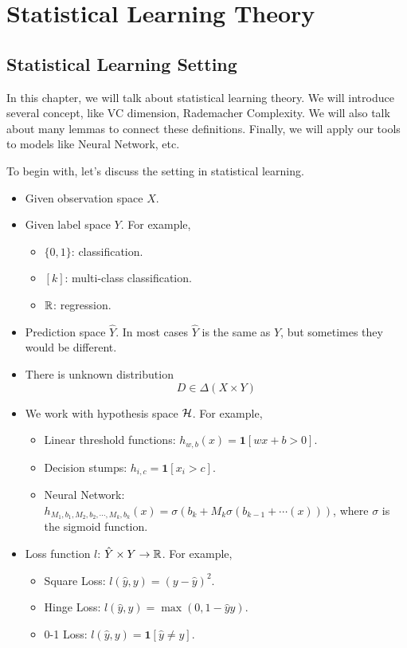 \documentclass[../main.tex]{subfiles}
\begin{document}
	\chapter{Statistical Learning Theory}
	
	\section{Statistical Learning Setting}
	In this chapter, we will talk about statistical learning theory. We will introduce several concept, like VC dimension, Rademacher Complexity. We will also talk about many lemmas to connect these definitions. Finally, we will apply our tools to models like Neural Network, etc.
	
	To begin with, let's discuss the setting in statistical learning.
	
	\begin{itemize}
		\item Given observation space $X$.
		\item Given label space $Y$. For example,
			\begin{itemize}
				\item $\{0,1\}$: classification.
				\item $[k]$: multi-class classification.
				\item $\mathbb{R}$: regression.
			\end{itemize}
		\item Prediction space $\hat{Y}$. In most cases $\hat{Y}$ is the same as $Y$, but sometimes they would be different.
		\item There is unknown distribution
		\begin{equation*}
		D\in \Delta(X\times Y)
		\end{equation*}
		\item We work with hypothesis space $\mathcal{H}$. For example,
			\begin{itemize}
				\item Linear threshold functions: $h_{w,b}(x) = \mathbf{1}[wx + b > 0]$.
				\item Decision stumps: $h_{i,c} = \mathbf{1}[x_i > c]$.
				\item Neural Network: $h_{M_1,b_1,M_2,b_2,\cdots,M_k,b_k}(x) = \sigma(b_k + M_k\sigma(b_{k-1} + \cdots (x)))$, where $\sigma$ is the sigmoid function.
			\end{itemize}
		\item Loss function $l$: $\hat{Y} \times Y \to \mathbb{R}$. For example,
		\begin{itemize}
			\item Square Loss: $l(\hat{y},y) = (y - \hat{y})^2$.
			\item Hinge Loss: $l(\hat{y},y) = \max(0, 1 - \hat{y}y)$.
			\item 0-1 Loss: $l(\hat{y},y) = \mathbf{1}[\hat{y} \neq y]$.
		\end{itemize}
	\end{itemize}
\end{document}
